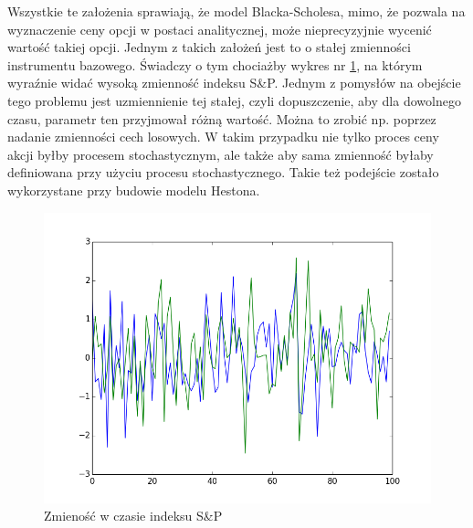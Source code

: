 \documentclass{pracamgr}
\begin{document}
Wszystkie te założenia sprawiają, że model Blacka-Scholesa, mimo, że pozwala na wyznaczenie ceny opcji w postaci analitycznej, może nieprecyzyjnie wycenić wartość takiej opcji.
Jednym z takich założeń jest to o stałej zmienności instrumentu bazowego. Świadczy o tym chociażby
wykres nr \ref{fig:vix}, na którym wyraźnie widać wysoką zmienność indeksu S\&P. Jednym z pomysłów na obejście tego problemu jest uzmiennienie tej stałej, czyli dopuszczenie, aby dla dowolnego czasu, parametr ten przyjmował różną wartość. Można to zrobić np. poprzez nadanie zmienności cech losowych. W takim przypadku nie tylko proces ceny akcji byłby procesem stochastycznym, ale także aby sama zmienność byłaby definiowana przy użyciu procesu stochastycznego. Takie też podejście zostało wykorzystane przy budowie modelu Hestona. \cite{greenwade93}



\begin{figure}
  \centering
  \includegraphics[width=150mm]{corr.png}
  \caption{Zmieność w czasie indeksu S\&P}\label{fig:vix}
\end{figure}


\end{document}

